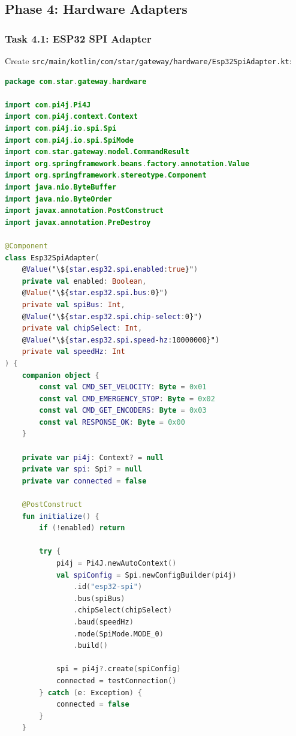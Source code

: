 \documentclass[11pt,letterpaper]{article}
\begin{document}
\subsection{Phase 4: Hardware Adapters}

\subsubsection{Task 4.1: ESP32 SPI Adapter}

Create \texttt{src/main/kotlin/com/star/gateway/hardware/Esp32SpiAdapter.kt}:

\begin{lstlisting}[language=Kotlin, caption=Esp32SpiAdapter.kt]
package com.star.gateway.hardware

import com.pi4j.Pi4J
import com.pi4j.context.Context
import com.pi4j.io.spi.Spi
import com.pi4j.io.spi.SpiMode
import com.star.gateway.model.CommandResult
import org.springframework.beans.factory.annotation.Value
import org.springframework.stereotype.Component
import java.nio.ByteBuffer
import java.nio.ByteOrder
import javax.annotation.PostConstruct
import javax.annotation.PreDestroy

@Component
class Esp32SpiAdapter(
    @Value("\${star.esp32.spi.enabled:true}")
    private val enabled: Boolean,
    @Value("\${star.esp32.spi.bus:0}")
    private val spiBus: Int,
    @Value("\${star.esp32.spi.chip-select:0}")
    private val chipSelect: Int,
    @Value("\${star.esp32.spi.speed-hz:10000000}")
    private val speedHz: Int
) {
    companion object {
        const val CMD_SET_VELOCITY: Byte = 0x01
        const val CMD_EMERGENCY_STOP: Byte = 0x02
        const val CMD_GET_ENCODERS: Byte = 0x03
        const val RESPONSE_OK: Byte = 0x00
    }

    private var pi4j: Context? = null
    private var spi: Spi? = null
    private var connected = false

    @PostConstruct
    fun initialize() {
        if (!enabled) return

        try {
            pi4j = Pi4J.newAutoContext()
            val spiConfig = Spi.newConfigBuilder(pi4j)
                .id("esp32-spi")
                .bus(spiBus)
                .chipSelect(chipSelect)
                .baud(speedHz)
                .mode(SpiMode.MODE_0)
                .build()

            spi = pi4j?.create(spiConfig)
            connected = testConnection()
        } catch (e: Exception) {
            connected = false
        }
    }


\end{lstlisting}
\end{document}
